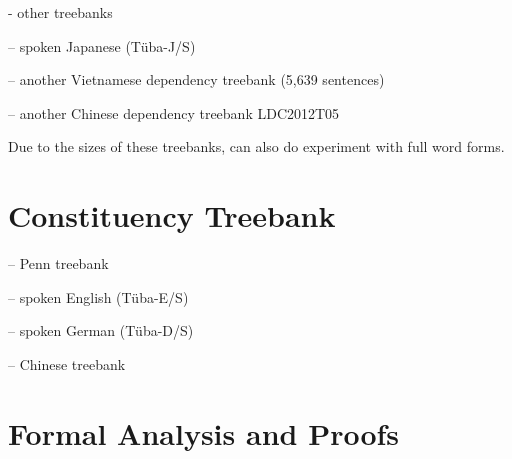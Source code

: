 \documentclass[11pt,letterpaper]{article}
\begin{document}
- other treebanks



-- spoken Japanese (T{\"u}ba-J/S)

-- another Vietnamese dependency treebank \citep{nguyen-bktreebank:-2017} (5,639 sentences)


-- another Chinese dependency treebank LDC2012T05


Due to the sizes of these treebanks, can also do experiment with full word forms.


\section{Constituency Treebank}

-- Penn treebank \citep{marcus-building-1993}

-- spoken English (T{\"u}ba-E/S)

-- spoken German (T{\"u}ba-D/S)

-- Chinese treebank \citep{xue-chinese-2013}


\section{Formal Analysis and Proofs}

\end{document}
